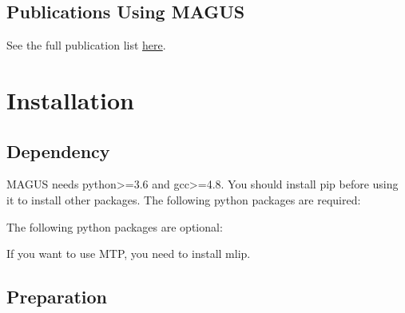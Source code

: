 \documentclass[12pt,oneside]{book}
\begin{document}
\section{Publications Using MAGUS}
  See the full publication list \href{https://gitlab.com/bigd4/magus/-/wikis/home/Publications}{here}.




\chapter{Installation}
\section{Dependency}
MAGUS needs python>=3.6 and gcc>=4.8. You should install pip before using it to install other packages. The following python packages are required:


The following python packages are optional:


If you want to use MTP, you need to install mlip.


\section{Preparation}
\end{document}
